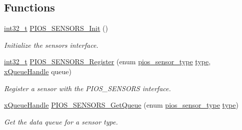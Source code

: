\subsection*{Functions}
\begin{DoxyCompactItemize}
\item 
\hyperlink{group___n_a_m_e_gafd12020da5a235dfcf0c3c748fb5baed}{int32\-\_\-t} \hyperlink{group___p_i_o_s___s_e_n_s_o_r_s_ga382f3e734c0289835d99e3a8410a28bd}{P\-I\-O\-S\-\_\-\-S\-E\-N\-S\-O\-R\-S\-\_\-\-Init} ()
\begin{DoxyCompactList}\small\item\em Initialize the sensors interface. \end{DoxyCompactList}\item 
\hyperlink{group___n_a_m_e_gafd12020da5a235dfcf0c3c748fb5baed}{int32\-\_\-t} \hyperlink{group___p_i_o_s___s_e_n_s_o_r_s_gadd19368ecca5b7d027ce475e3677692b}{P\-I\-O\-S\-\_\-\-S\-E\-N\-S\-O\-R\-S\-\_\-\-Register} (enum \hyperlink{group___p_i_o_s___s_e_n_s_o_r_s_gadad1b67d985a6c9c150a70d23aac96a0}{pios\-\_\-sensor\-\_\-type} \hyperlink{pios__opahrs__proto_8h_a6ea5dbffda85c43d867d4d9197e8796f}{type}, \hyperlink{_common_2_libraries_2_free_r_t_o_s_2_source_2include_2queue_8h_a229037f755b756156e34a440ce134b8b}{x\-Queue\-Handle} queue)
\begin{DoxyCompactList}\small\item\em Register a sensor with the P\-I\-O\-S\-\_\-\-S\-E\-N\-S\-O\-R\-S interface. \end{DoxyCompactList}\item 
\hyperlink{_common_2_libraries_2_free_r_t_o_s_2_source_2include_2queue_8h_a229037f755b756156e34a440ce134b8b}{x\-Queue\-Handle} \hyperlink{group___p_i_o_s___s_e_n_s_o_r_s_gaec312826a58f6c29ef0a00f56e37cfbc}{P\-I\-O\-S\-\_\-\-S\-E\-N\-S\-O\-R\-S\-\_\-\-Get\-Queue} (enum \hyperlink{group___p_i_o_s___s_e_n_s_o_r_s_gadad1b67d985a6c9c150a70d23aac96a0}{pios\-\_\-sensor\-\_\-type} \hyperlink{pios__opahrs__proto_8h_a6ea5dbffda85c43d867d4d9197e8796f}{type})
\begin{DoxyCompactList}\small\item\em Get the data queue for a sensor type. \end{DoxyCompactList}\end{DoxyCompactItemize}
